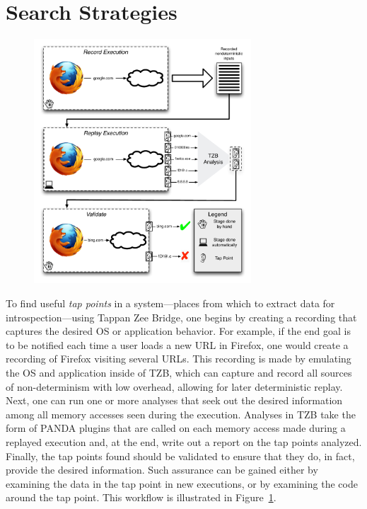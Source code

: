 \section{Search Strategies}
\label{sec:technical}

\begin{figure}
    \begin{center}
        \includegraphics[width=3.2in]{figures/tzbarch.pdf}
    \end{center}
    \caption{}
    \label{fig:workflow}
\end{figure}

To find useful \emph{tap points} in a system---places from which to
extract data for introspection---using Tappan Zee Bridge, one begins by
creating a recording that captures the desired OS or application
behavior. For example, if the end goal is to be notified each time a
user loads a new URL in Firefox, one would create a recording of Firefox
visiting several URLs. This recording is made by emulating the OS and
application inside of TZB, which can capture and record all sources of
non-determinism with low overhead, allowing for later deterministic
replay. Next, one can run one or more analyses that seek out the desired
information among all memory accesses seen during the execution.
Analyses in TZB take the form of PANDA plugins that are called on each
memory access made during a replayed execution and, at the end, write
out a report on the tap points analyzed. Finally, the tap points found
should be validated to ensure that they do, in fact, provide the desired
information. Such assurance can be gained either by examining the data
in the tap point in new executions, or by examining the code around the
tap point. This workflow is illustrated in Figure~\ref{fig:workflow}.

